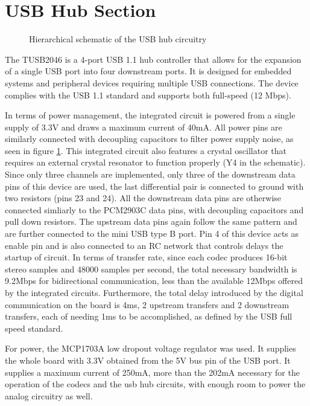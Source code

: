 \section{USB Hub Section}

\begin{figure}[H]
    \center
    
    \caption{Hierarchical schematic of the USB hub circuitry}
    \label{fig:sch_usbhub}
\end{figure}

The TUSB2046 is a 4-port USB 1.1 hub controller that allows for the expansion
of a single USB port into four downstream ports. It is designed for embedded
systems and peripheral devices requiring multiple USB connections. The device
complies with the USB 1.1 standard and supports both full-speed (12 Mbps).

In terms of power management, the integrated circuit is powered from a single
supply of 3.3V and draws a maximum current of 40mA.
\cite{tusb}
All power pins are similarly connected with decoupling capacitors to filter
power supply noise, as seen in figure \ref{fig:sch_usbhub}.
This integrated circuit also features a crystal oscillator
that requires an external crystal resonator to function properly (Y4 in the
schematic). Since only three channels are implemented, only three of the
downstream data pins of this device are used, the last differential pair is
connected to ground with two resistors (pins 23 and 24). All the downstream
data pins are otherwise connected simliarly to the PCM2903C data pins, with
decoupling capacitors and pull down resistors. The upstream data pins again
follow the same pattern and are further connected to the mini USB type B port.
Pin 4 of this device acts as enable pin and is also connected to an RC network
that controls delays the startup of circuit.
In terms of transfer rate, since each codec produces 16-bit stereo samples and
48000 samples per second, the total necessary bandwidth is 9.2Mbps for
bidirectional communication, less than the available 12Mbps offered by the
integrated circuits. Furthermore, the total delay introduced by the digital
communication on the board is 4ms, 2 upstream transfers and 2 downstream
transfers, each of needing 1ms to be accomplished, as defined by the USB full
speed standard\cite{usb20}.

For power, the MCP1703A low dropout voltage regulator was used. It supplies the
whole board with 3.3V obtained from the 5V bus pin of the USB port. It supplies
a maximum current of 250mA, more than the 202mA necessary for the operation of
the codecs and the usb hub circuits, with enough room to power the analog
circuitry as well.

